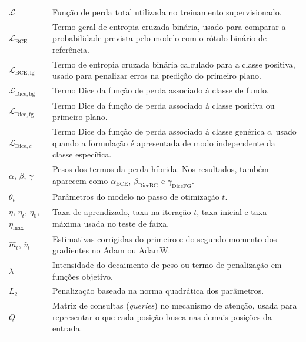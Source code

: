 \begin{longtable}{p{3.0cm}p{12.0cm}}
  $\mathcal{L}$ &
  Função de perda total utilizada no treinamento supervisionado.\\

  $\mathcal{L}_{\mathrm{BCE}}$ &
  Termo geral de entropia cruzada binária, usado para comparar a probabilidade
  prevista pelo modelo com o rótulo binário de referência.\\

  $\mathcal{L}_{\mathrm{BCE},\mathrm{fg}}$ &
  Termo de entropia cruzada binária calculado para a classe positiva, usado para
  penalizar erros na predição do primeiro plano.\\

  $\mathcal{L}_{\mathrm{Dice,bg}}$ &
  Termo Dice da função de perda associado à classe de fundo.\\

  $\mathcal{L}_{\mathrm{Dice,fg}}$ &
  Termo Dice da função de perda associado à classe positiva ou primeiro plano.\\

  $\mathcal{L}_{\mathrm{Dice},c}$ &
  Termo Dice da função de perda associado à classe genérica $c$, usado quando a
  formulação é apresentada de modo independente da classe específica.\\

  $\alpha$, $\beta$, $\gamma$ &
  Pesos dos termos da perda híbrida. Nos resultados, também aparecem como
  $\alpha_{\mathrm{BCE}}$, $\beta_{\mathrm{DiceBG}}$ e
  $\gamma_{\mathrm{DiceFG}}$.\\

  $\theta_t$ &
  Parâmetros do modelo no passo de otimização $t$.\\

  $\eta$, $\eta_t$, $\eta_0$, $\eta_{\max}$ &
  Taxa de aprendizado, taxa na iteração $t$, taxa inicial e taxa máxima usada no
  teste de faixa.\\

  $\hat{m}_t$, $\hat{v}_t$ &
  Estimativas corrigidas do primeiro e do segundo momento dos gradientes no Adam
  ou AdamW.\\

  $\lambda$ &
  Intensidade do decaimento de peso ou termo de penalização em funções objetivo.\\

  $L_2$ &
  Penalização baseada na norma quadrática dos parâmetros.\\

  $Q$ &
  Matriz de consultas (\textit{queries}) no mecanismo de atenção, usada para
  representar o que cada posição busca nas demais posições da entrada.\\


\end{longtable}
